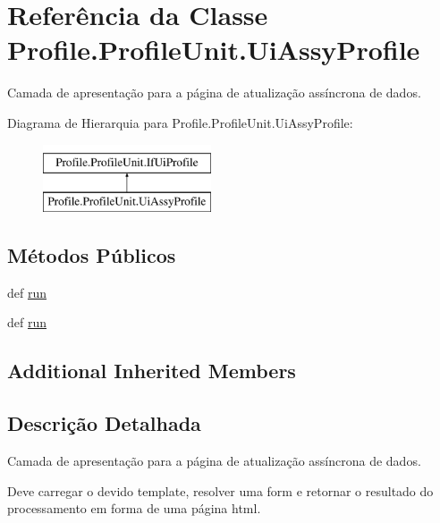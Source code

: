 \hypertarget{classProfile_1_1ProfileUnit_1_1UiAssyProfile}{\section{Referência da Classe Profile.\-Profile\-Unit.\-Ui\-Assy\-Profile}
\label{classProfile_1_1ProfileUnit_1_1UiAssyProfile}
}


Camada de apresentação para a página de atualização assíncrona de dados.  


Diagrama de Hierarquia para Profile.\-Profile\-Unit.\-Ui\-Assy\-Profile\-:\begin{figure}[H]
\begin{center}
\leavevmode
\includegraphics[height=2.000000cm]{d8/d84/classProfile_1_1ProfileUnit_1_1UiAssyProfile}
\end{center}
\end{figure}
\subsection*{Métodos Públicos}
\begin{DoxyCompactItemize}
\item 
def \hyperlink{classProfile_1_1ProfileUnit_1_1UiAssyProfile_af540264c64ed90e43bb29bd1303ecda3}{run}
\item 
def \hyperlink{classProfile_1_1ProfileUnit_1_1UiAssyProfile_af540264c64ed90e43bb29bd1303ecda3}{run}
\end{DoxyCompactItemize}
\subsection*{Additional Inherited Members}


\subsection{Descrição Detalhada}
Camada de apresentação para a página de atualização assíncrona de dados. 

Deve carregar o devido template, resolver uma form e retornar o resultado do processamento em forma de uma página html. 

